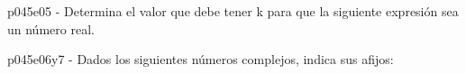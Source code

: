 \documentclass[spanish, 11pt]{exam}
\begin{document}
\begin{questions}
\begin{multicols}{2}
        \end{multicols}
        \question p045e05 - Determina el valor que debe tener k para que la siguiente expresión sea un número real.
        \begin{multicols}{2} 
        \end{multicols}
        \question p045e06y7 - Dados los siguientes números complejos, indica sus afijos:
        \begin{multicols}{2} 

\end{multicols}
\end{questions}
\end{document}
